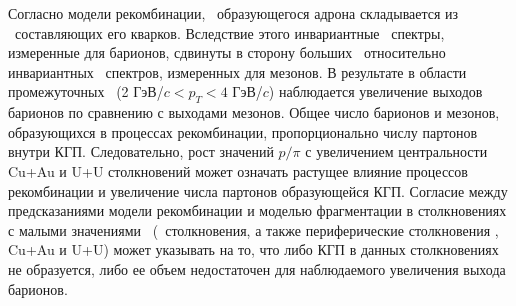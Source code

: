 Согласно модели рекомбинации, \pT \ образующегося адрона складывается из \pT \ составляющих его кварков. Вследствие этого инвариантные \pT \ спектры, измеренные для барионов, сдвинуты в сторону больших \pT \ относительно инвариантных \pT \ спектров, измеренных для мезонов. В результате в области промежуточных \pT \ (2 ГэВ/$c < p_T < 4$ ГэВ/$c$) наблюдается увеличение выходов барионов по сравнению с выходами мезонов. Общее число барионов и мезонов, образующихся в процессах рекомбинации, пропорционально числу партонов внутри КГП. Следовательно, рост значений $p/\pi$ с увеличением центральности Cu+Au и U+U столкновений может означать растущее влияние процессов рекомбинации и увеличение числа партонов образующейся КГП. Согласие между предсказаниями модели рекомбинации и моделью фрагментации в столкновениях с малыми значениями \Npart \ (\pal \ столкновения, а также периферические столкновения \heau, Cu+Au и U+U) может указывать на то, что либо КГП в данных столкновениях не образуется, либо ее объем  недостаточен для наблюдаемого увеличения выхода барионов.



\begin{comment}
\begin{figure}[] 
	\centerfloat
	\includegraphics [width=1\linewidth]{Simulation/RAA_AMPT_Pythia.png}
	\caption{Сравнение факторов ядерной модификации (\rab), полученных для \pipm, \Kpm, \prot \ b \aprot \ в рамках фрагментационной (Pythia8) и рекомбинационной (AMPT) моделей, с экспериментальными результатами в различных центральностях \pal, \heau, Cu+Au и U+U столкновений. } 
	\label{img:RAA_sym}
\end{figure}
\end{comment}

